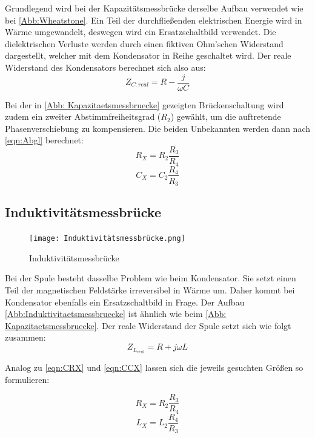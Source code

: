 \documentclass[
  bibliography=totoc,     %
  captions=tableheading,  %
  titlepage=firstiscover, %
]{scrartcl}
\begin{document}
  Grundlegend wird bei der Kapazitätsmessbrücke derselbe Aufbau verwendet wie bei \autoref{Abb:Wheatstone}. Ein Teil der
  durchfließenden elektrischen Energie wird in Wärme umgewandelt, deswegen wird ein Ersatzschaltbild verwendet.
  Die dielektrischen Verluste werden durch einen fiktiven Ohm'schen Widerstand dargestellt, welcher mit dem Kondensator in 
  Reihe geschaltet wird. Der reale Widerstand des Kondensators berechnet sich also aus:
  \begin{equation}
    Z_{C:{real}} = R - \frac{j}{\omega C}
  \end{equation}

  Bei der in \autoref{Abb: Kapazitaetsmessbruecke} gezeigten Brückenschaltung wird zudem ein zweiter Abstimmfreiheitsgrad ($R_2$) gewählt,
  um die auftretende Phasenverschiebung zu kompensieren.
  Die beiden Unbekannten werden dann nach \autoref{eqn:Abgl} berechnet:
  \begin{equation}
    R_X = R_2 \frac{R_3}{R_4} \label{eqn:CRX}
  \end{equation}
  \begin{equation}
    C_X = C_2 \frac{R_4}{R_3} \label{eqn:CCX}
  \end{equation}

  \subsection{Induktivitätsmessbrücke}

  \begin{figure}
    \centering
    \texttt{[image: Induktivitätsmessbrücke.png]}
    \caption{Induktivitätsmessbrücke \cite{1}}
    \label{Abb:Induktivitaetsmessbruecke}
  \end{figure}

  Bei der Spule besteht dasselbe Problem wie beim Kondensator. Sie setzt einen Teil der magnetischen Feldstärke irreversibel 
  in Wärme um. Daher kommt bei Kondensator ebenfalls ein Ersatzschaltbild in Frage. Der Aufbau \autoref{Abb:Induktivitaetsmessbruecke}
  ist ähnlich wie beim \autoref{Abb: Kapazitaetsmessbruecke}. Der reale Widerstand der Spule setzt sich wie folgt zusammen:
  \begin{equation}
    Z_{L_{real}} = R + j \omega L
  \end{equation}

  Analog zu \autoref{eqn:CRX} und \autoref{eqn:CCX} lassen sich die jeweils gesuchten Größen so formulieren:

  \begin{equation}
    R_X = R_2 \frac{R_3}{R_4} \label{eqn:LRX}
  \end{equation}
  \begin{equation}
    L_X = L_2 \frac{R_4}{R_3} \label{eqn:LLX}
  \end{equation}
\end{document}
